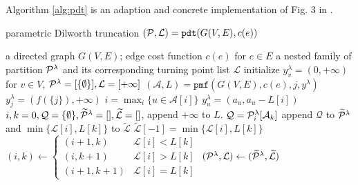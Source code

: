 \documentclass{article}
\begin{document}
Algorithm \ref{alg:pdt} is an adaption and concrete implementation of Fig. 3 in \cite{RN4}.

\begin{algorithm}
	\caption{parametric Dilworth truncation $(\P, \mathcal{L})=\texttt{pdt}(G(V,E), c(e))$}\label{alg:pdt}
	\begin{algorithmic}[1]
		\REQUIRE a directed graph $G(V, E)$; edge cost function $c(e)$ for $e\in E$
		\ENSURE a nested family of partition $\P^{\lambda}$ and its corresponding turning point list $\mathcal{L}$
		\STATE initialize $y^{\lambda}_v = (0, +\infty)$ for $ v \in V$, $\P^{\lambda} = [\{\emptyset\}], \mathcal{L} = [+\infty]$
		\STATE  $(\mathcal{A}, L) = \texttt{pmf}(G(V,E), c(e), j, y^{\lambda})$
		\STATE $y^{\lambda}_j = (f(\{j\}), +\infty)$
		\ELSE
		\STATE $ i = \max_i \{ u \in \mathcal{A}[i]\}$
		\STATE $y_u^{\lambda} = (a_u, a_u - L[i])$
		\ENDIF
		\ENDIF
		\ENDFOR
		\STATE $i, k = 0, \mathcal{Q} = \{\emptyset\}, \widetilde{\mathcal{\P}}^{\lambda} = [], \widetilde{\mathcal{L}} = []$, append $+\infty$ to $L$.
		\STATE $\mathcal{Q} = \P^{\lambda}_i[\mathcal{A}_k]$
		\STATE append $\mathcal{Q}$ to $\widetilde{\mathcal{\P}}^{\lambda}$ and $\min\{\mathcal{L}[i], L[k]\}$
		to $\widetilde{\mathcal{L}}$
		\ELSE
		\STATE $\widetilde{\mathcal{L}}[-1] = \min\{\mathcal{L}[i], L[k]\}$ \footnotemark
		\ENDIF
		\STATE $(i, k) \leftarrow \begin{cases} (i+1, k) & \mathcal{L}[i] < L[k] \\  (i, k+1) & \mathcal{L}[i] > L[k]\\ (i+1, k+1) & \mathcal{L}[i] = L[k]\end{cases}$
		\ENDWHILE
		\STATE $(\P^{\lambda}, \mathcal{L}) \leftarrow (\widetilde{\mathcal{\P}}^{\lambda},  \widetilde{\mathcal{L}})$
		\ENDFOR
	\end{algorithmic}
\end{algorithm}
\end{document}
